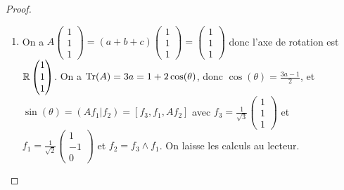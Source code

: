 \documentclass[12pt]{article}
\begin{document}
\begin{proof}
\begin{enumerate}
		\item On a $A\begin{pmatrix}
			1\\1\\1
		\end{pmatrix}=(a+b+c)\begin{pmatrix}
			1\\1\\1
		\end{pmatrix}=\begin{pmatrix}
			1\\1\\1
		\end{pmatrix}$ donc l'axe de rotation est $\mathbb{R}\begin{pmatrix}
			1\\1\\1
		\end{pmatrix}$. On a $\operatorname{Tr}(A)=3a=1+2\cos(\theta)$, donc $\cos(\theta)=\frac{3a-1}{2}$, et $\sin(\theta)=(Af_1|f_2)=[f_3,f_1,Af_2]$ avec $f_3=\frac{1}{\sqrt{3}}\begin{pmatrix}
			1\\1\\1
		\end{pmatrix}$ et $f_1=\frac{1}{\sqrt{2}}\begin{pmatrix}
			1\\-1\\0
		\end{pmatrix}$ et $f_2=f_3\wedge f_1$. On laisse les calculs au lecteur.
	\end{enumerate}
\end{proof}
\end{document}
